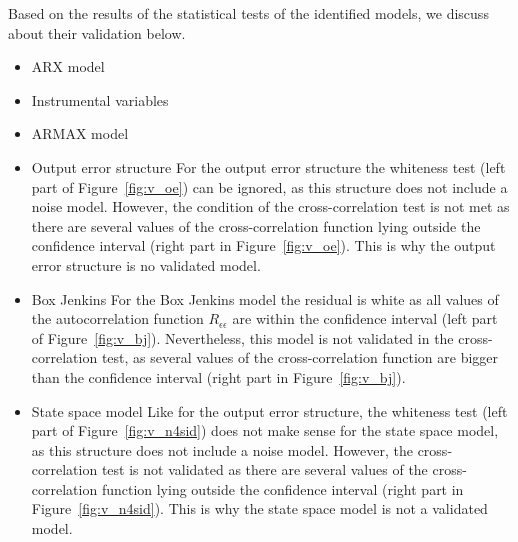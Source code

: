 Based on the results of the statistical tests of the identified models, we discuss about their validation below.
\begin{itemize}
\item{ARX model}
\item{Instrumental variables}
\item{ARMAX model}
\item{Output error structure} For the output error structure the whiteness test (left part of Figure~\ref{fig:v_oe}) can be ignored, as this structure does not include a noise model. However, the condition of the cross-correlation test is not met as there are several values of the cross-correlation function lying outside the confidence interval (right part in Figure~\ref{fig:v_oe}). This is why the output error structure is no validated model. 
\item{Box Jenkins} For the Box Jenkins model the residual is white as all values of the autocorrelation function $R_{\epsilon \epsilon}$ are within the confidence interval (left part of Figure~\ref{fig:v_bj}). Nevertheless, this model is not validated in the cross-correlation test, as several values of the cross-correlation function are bigger than the confidence interval (right part in Figure~\ref{fig:v_bj}).
\item{State space model}
Like for the output error structure, the whiteness test (left part of Figure~\ref{fig:v_n4sid}) does not make sense for the state space model, as this structure does not include a noise model. However, the cross-correlation test is not validated as there are several values of the cross-correlation function lying outside the confidence interval (right part in Figure~\ref{fig:v_n4sid}). This is why the state space model is not a validated model.
\end{itemize}


